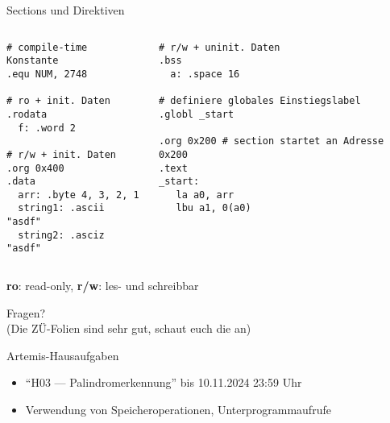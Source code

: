 \documentclass[
  german,            %
  aspectratio=169,    %
]{tumbeamer}
\begin{document}
\begin{frame}[c, fragile]{Sections und Direktiven}
  \begin{columns}[c]
    \begin{column}{0.5\textwidth}
      \begin{verbatim}
# compile-time Konstante
.equ NUM, 2748 

# ro + init. Daten
.rodata
  f: .word 2

# r/w + init. Daten
.org 0x400
.data
  arr: .byte 4, 3, 2, 1
  string1: .ascii "asdf"
  string2: .asciz "asdf"

        \end{verbatim}
    \end{column}
    \begin{column}{0.5\textwidth}
      \begin{verbatim}
# r/w + uninit. Daten
.bss
  a: .space 16

# definiere globales Einstiegslabel
.globl _start

.org 0x200 # section startet an Adresse 0x200
.text
_start:
   la a0, arr
   lbu a1, 0(a0)
      \end{verbatim}
    \end{column}
  \end{columns}
  \begin{center}
  \small{\textbf{ro}: read-only, \textbf{r/w}: les- und schreibbar}
  \end{center}
\end{frame}


\begin{frame}[c]{}{}
  \begin{center}
    \LARGE Fragen?\\
    \Large (Die ZÜ-Folien sind sehr gut, schaut euch die an)
  \end{center}
\end{frame}

\begin{frame}[c]{Artemis-Hausaufgaben}{}
  \begin{itemize}
    \item \enquote{H03 --- Palindromerkennung} bis 10.11.2024 23:59 Uhr
    \item Verwendung von Speicheroperationen, Unterprogrammaufrufe
  \end{itemize}
\end{frame}
\end{document}
